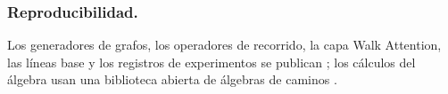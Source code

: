 \documentclass[runningheads]{llncs}
\begin{document}
\subsubsection*{Reproducibilidad.}
Los generadores de grafos, los operadores de recorrido, la capa Walk Attention,
las líneas base y los registros de experimentos se publican
\cite{repo_walkattention}; los cálculos del álgebra usan una biblioteca abierta
de álgebras de caminos \cite{repo_aiqquivers}.



\end{document}
